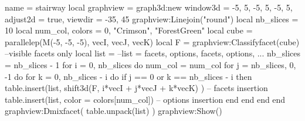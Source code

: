 \begin{luadraw}{name = stairway}
    local graphview = graph3d:new{
        window3d = {-5, 5, -5, 5, -5, 5},
        adjust2d = true,
        viewdir  = {-35, 45}
    }
    graphview:Linejoin("round")
    local nb_slices = 10
    local num_col, colors = 0, {"Crimson", "ForestGreen"}
    local cube = parallelep(M(-5, -5, -5), vecI, vecJ, vecK)
    local F = graphview:Classifyfacet(cube)  --visible facets only
    local list = {} --list = {facets, options, facets, options, ...}
    nb_slices = nb_slices - 1
    for i = 0, nb_slices do
        num_col = num_col%
        for j = nb_slices, 0, -1 do
            for k = 0, nb_slices - i do
                if j == 0 or k == nb_slices - i then
                    table.insert(list, shift3d(F, i*vecI + j*vecJ + k*vecK) ) -- facets insertion
                    table.insert(list, {color = colors[num_col]}) -- options insertion
                end
            end
        end
    end
    graphview:Dmixfacet( table.unpack(list) )
    graphview:Show()
\end{luadraw}
